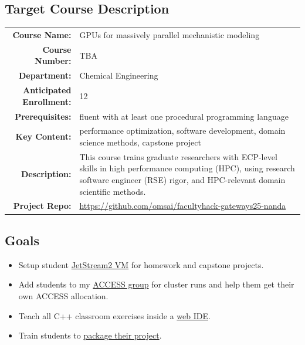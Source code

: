 \documentclass{article}
\begin{document}
\begin{tcbposter}
{  \subsection*{\textcolor{fh-blue}{Target Course Description}}
  \vspace{-.5\baselineskip}
  {
    \begin{tabularx}{\linewidth}{>{\bfseries}r X}
      \toprule
      Course Name:
      & GPUs for massively parallel mechanistic modeling\\
      Course Number:
      & TBA\\
      Department:
      & Chemical Engineering\\
      Anticipated Enrollment:
      & 12\\
      Prerequisites:
      & fluent with at least one %
      procedural programming language\\
      Key Content:
      & performance optimization, %
      software development, %
      domain science methods, %
      capstone project\\
      Description:
      & This course trains graduate researchers %
      with ECP-level skills in high performance computing (HPC), %
      using research software engineer (RSE) rigor, %
      and HPC-relevant domain scientific methods.\\
      Project Repo:
      & \small \url{https://github.com/omsai/facultyhack-gateways25-nanda}\\
      \bottomrule
    \end{tabularx}
  }

  \vspace{-\baselineskip}
  \subsection*{\textcolor{fh-blue}{Goals}}
  \vspace{-.5\baselineskip}
  \begin{itemize}
  \setlength{\itemsep}{-.5em}
  \item Setup student \ul{JetStream2 VM} for homework and capstone projects.
  \item Add students to my \ul{ACCESS group} for cluster runs and %
    help them get their own ACCESS allocation.
  \item Teach all C++ classroom exercises inside a \ul{web IDE}. 
  \item Train students to \ul{package their project}.
  \end{itemize}
  }


\end{tcbposter}
\end{document}

